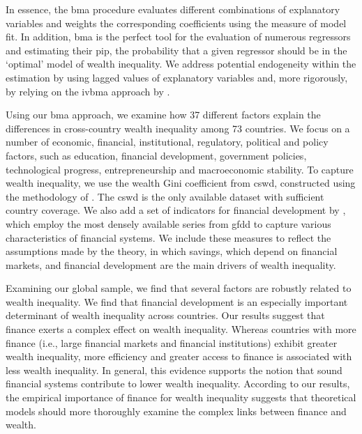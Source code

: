 \documentclass[a4paper,11pt]{article}
\begin{document}
In essence, the \ac{bma} procedure evaluates different combinations of explanatory variables and weights the corresponding coefficients using the measure of model fit. In addition, \ac{bma} is the perfect tool for the evaluation of numerous regressors and estimating their \ac{pip}, the probability that a given regressor should be in the `optimal' model of wealth inequality. We address potential endogeneity within the estimation by using lagged values of explanatory variables and, more rigorously, by relying on the \ac{ivbma} approach by \citet{KarlLenkoski2012}.

Using our \ac{bma} approach, we examine how 37 different factors explain the differences in cross-country wealth inequality among 73 countries. We focus on a number of economic, financial, institutional, regulatory, political and policy factors, such as education, financial development, government policies, technological progress, entrepreneurship and macroeconomic stability. To capture wealth inequality, we use the wealth Gini coefficient from \ac{cswd}, constructed using the methodology of \citet{daviesetal2017}. The \ac{cswd} is the only available dataset with sufficient country coverage. We also add a set of indicators for financial development by \citet{svirydzenka2016introducing}, which employ the most densely available series from \ac{gfdd} to capture various characteristics of financial systems. We include these measures to reflect the assumptions made by the theory, in which savings, which depend on financial markets, and financial development are the main drivers of wealth inequality.

Examining our global sample, we find that several factors are robustly related to wealth inequality. We find that financial development is an especially important determinant of wealth inequality across countries. Our results suggest that finance exerts a complex effect on wealth inequality. Whereas countries with more finance (i.e., large financial markets and financial institutions) exhibit greater wealth inequality, more efficiency and greater access to finance is associated with less wealth inequality. In general, this evidence supports the notion that sound financial systems contribute to lower wealth inequality. According to our results, the empirical importance of finance for wealth inequality suggests that theoretical models should more thoroughly examine the complex links between finance and wealth.
\end{document}
